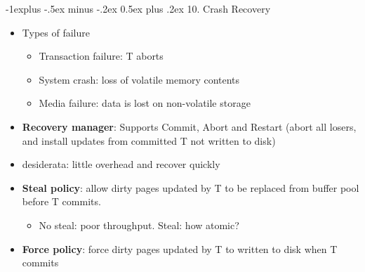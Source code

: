 \documentclass[8pt, landscape]{extarticle}
\makeatletter
\renewcommand{\subsection}{\@startsection{subsection}{2}{0mm}%
  {-1explus -.5ex minus -.2ex}%
  {0.5ex plus .2ex}%
{\normalfont\normalsize\bfseries}}
\makeatother
\begin{document}
\begin{multicols*}{4}
  \subsection{10. Crash Recovery}
  \begin{itemize}
    \item Types of failure
    \begin{itemize}
      \item Transaction failure: T aborts
      \item System crash: loss of volatile memory contents
      \item Media failure: data is lost on non-volatile storage
    \end{itemize}
    \item \textbf{Recovery manager}: Supports Commit, Abort and Restart (abort all losers, and install updates from committed T not written to disk)
    \item desiderata: little overhead and recover quickly
    \item \textbf{Steal policy}: allow dirty pages updated by T to be replaced from buffer pool before T commits.
    \begin{itemize}
      \item No steal: poor throughput. Steal: how atomic?
    \end{itemize}
    \item \textbf{Force policy}: force dirty pages updated by T to written to disk when T commits
    \begin{itemize}
    

\end{itemize}
\end{itemize}
\end{multicols*}
\end{document}
